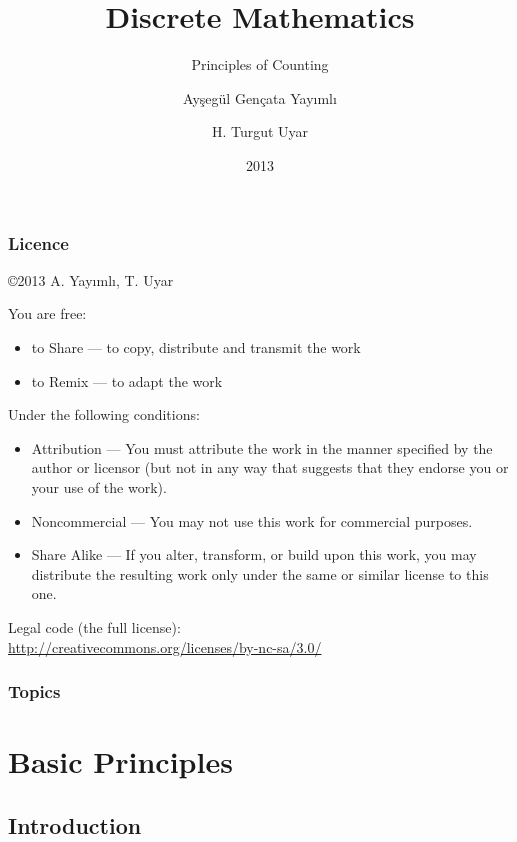 \documentclass[dvipsnames]{beamer}
\title{Discrete Mathematics}
\subtitle{Principles of Counting}
\author{Ayşegül Gençata Yayımlı \and H. Turgut Uyar}
\date{2013}
\begin{document}
\begin{frame}
  \titlepage
\end{frame}

\begin{frame}
  \frametitle{Licence}

  \hfill
  \copyright 2013 A. Yayımlı, T. Uyar

  \vfill
  \begin{tiny}
    You are free:
    \begin{itemize}
      \item to Share — to copy, distribute and transmit the work
      \item to Remix — to adapt the work
    \end{itemize}

    Under the following conditions:
    \begin{itemize}
      \item Attribution — You must attribute the work in the manner specified by
        the author or licensor (but not in any way that suggests that they
        endorse you or your use of the work).

      \item Noncommercial — You may not use this work for commercial purposes.

      \item Share Alike — If you alter, transform, or build upon this work, you
        may distribute the resulting work only under the same or similar license
        to this one.
    \end{itemize}
  \end{tiny}

  \vfill
  Legal code (the full license):\\
  \url{http://creativecommons.org/licenses/by-nc-sa/3.0/}
\end{frame}

\begin{frame}
  \frametitle{Topics}
  \tableofcontents
\end{frame}

\section{Basic Principles}

\subsection{Introduction}
\end{document}

